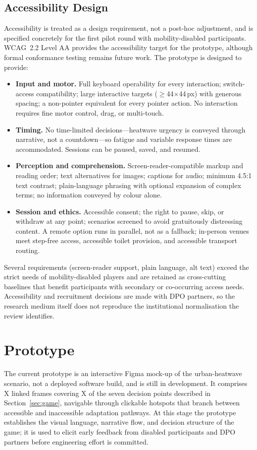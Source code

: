 \documentclass[sigconf]{acmart}
\begin{document}
\subsection{Accessibility Design}
Accessibility is treated as a design requirement, not a post-hoc
adjustment, and is specified concretely for the first pilot round with
mobility-disabled participants. WCAG~2.2 Level AA provides the
accessibility target for the prototype, although formal conformance
testing remains future work. The prototype is designed to provide:
\begin{itemize}
\item \textbf{Input and motor.} Full keyboard operability for every
interaction; switch-access compatibility; large interactive targets
($\geq$44$\times$44\,px) with generous spacing; a non-pointer equivalent
for every pointer action. No interaction requires fine motor control,
drag, or multi-touch.
\item \textbf{Timing.} No time-limited decisions---heatwave urgency is
conveyed through narrative, not a countdown---so fatigue and variable
response times are accommodated. Sessions can be paused, saved, and
resumed.
\item \textbf{Perception and comprehension.} Screen-reader-compatible
markup and reading order; text alternatives for images; captions for
audio; minimum 4.5:1 text contrast; plain-language phrasing with optional
expansion of complex terms; no information conveyed by colour alone.
\item \textbf{Session and ethics.} Accessible consent; the right to
pause, skip, or withdraw at any point; scenarios screened to avoid
gratuitously distressing content. A remote option runs in parallel, not
as a fallback; in-person venues meet step-free access, accessible toilet
provision, and accessible transport routing.
\end{itemize}
Several requirements (screen-reader support, plain language, alt text)
exceed the strict needs of mobility-disabled players and are retained as
cross-cutting baselines that benefit participants with secondary or
co-occurring access needs. Accessibility and recruitment decisions are
made with DPO partners, so the research medium itself does not reproduce
the institutional normalisation the review identifies.

\section{Prototype}
The current prototype is an interactive Figma mock-up of the
urban-heatwave scenario, not a deployed software build, and is still in
development. It comprises X linked frames covering X of the seven
decision points described in Section~\ref{sec:game}, navigable through
clickable hotspots that branch between accessible and inaccessible
adaptation pathways. At this stage the prototype establishes the visual
language, narrative flow, and decision structure of the game; it is used
to elicit early feedback from disabled participants and DPO partners
before engineering effort is committed.
\end{document}
